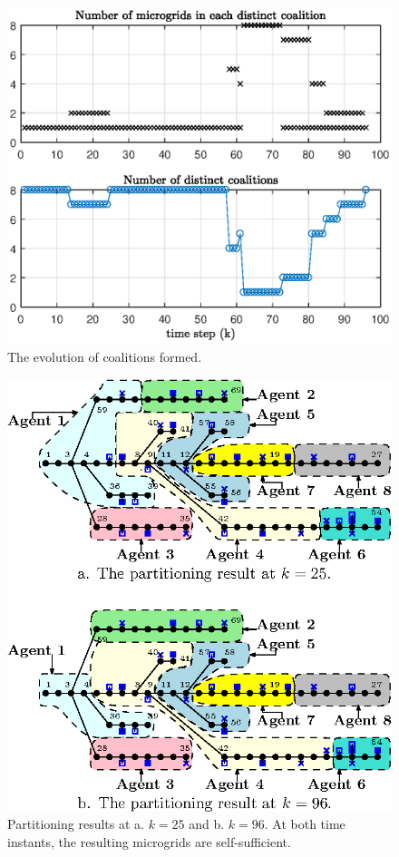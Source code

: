 \begin{figure}
	\centering
	\includegraphics[scale=0.6]{img/co_res.eps}
	\caption{The evolution of coalitions formed.
	}
	\label{fig:co_res}
\end{figure}
\iffalse 
\begin{figure}
	\centering
	\includegraphics[scale=0.9]{img/part_res.eps}
	\caption{Partitioning results at a. $k=25$ and b. $k=96$. At both time instants, the resulting microgrids are self-sufficient.
	}
	\label{fig:part_res}
\end{figure}
